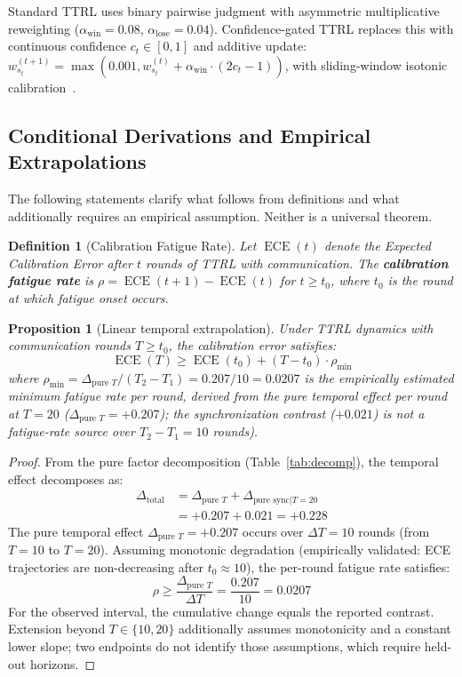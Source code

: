 \documentclass[11pt]{article}
\DeclareMathOperator{\ECE}{ECE}
\newtheorem{definition}{Definition}
\newtheorem{proposition}[theorem]{Proposition}
\begin{document}
Standard TTRL uses binary pairwise judgment with asymmetric multiplicative reweighting ($\alpha_{\text{win}} = 0.08$, $\alpha_{\text{lose}} = 0.04$). Confidence-gated TTRL replaces this with continuous confidence $c_t \in [0,1]$ and additive update: $w_{s_t}^{(t+1)} = \max(0.001, w_{s_t}^{(t)} + \alpha_{\text{win}} \cdot (2c_t - 1))$, with sliding-window isotonic calibration~\citep{niculescu2005predicting}.

\subsection{Conditional Derivations and Empirical Extrapolations}

The following statements clarify what follows from definitions and what additionally requires an empirical assumption. Neither is a universal theorem.

\begin{definition}[Calibration Fatigue Rate]
Let $\ECE(t)$ denote the Expected Calibration Error after $t$ rounds of TTRL with communication. The \textbf{calibration fatigue rate} is $\rho = \ECE(t+1) - \ECE(t)$ for $t \geq t_0$, where $t_0$ is the round at which fatigue onset occurs.
\end{definition}

\begin{proposition}[Linear temporal extrapolation]\label{thm:fatigue}
Under TTRL dynamics with communication rounds $T \geq t_0$, the calibration error satisfies:
\begin{equation}
    \ECE(T) \geq \ECE(t_0) + (T - t_0) \cdot \rho_{\min}
\end{equation}
where $\rho_{\min} = \Delta_{\text{pure }T}/(T_2 - T_1) = 0.207/10 = 0.0207$ is the empirically estimated minimum fatigue rate per round, derived from the pure temporal effect per round at $T{=}20$ ($\Delta_{\text{pure }T} = +0.207$); the synchronization contrast ($+0.021$) is not a fatigue-rate source over $T_2 - T_1 = 10$ rounds).
\end{proposition}

\begin{proof}
From the pure factor decomposition (Table~\ref{tab:decomp}), the temporal effect decomposes as:
\begin{align}
    \Delta_{\text{total}} &= \Delta_{\text{pure } T} + \Delta_{\text{pure sync}|T=20} \\
    &= +0.207 + 0.021 = +0.228
\end{align}
The pure temporal effect $\Delta_{\text{pure } T} = +0.207$ occurs over $\Delta T = 10$ rounds (from $T{=}10$ to $T{=}20$). Assuming monotonic degradation (empirically validated: ECE trajectories are non-decreasing after $t_0 \approx 10$), the per-round fatigue rate satisfies:
\begin{equation}
    \rho \geq \frac{\Delta_{\text{pure } T}}{\Delta T} = \frac{0.207}{10} = 0.0207
\end{equation}
For the observed interval, the cumulative change equals the reported contrast. Extension beyond $T\in\{10,20\}$ additionally assumes monotonicity and a constant lower slope; two endpoints do not identify those assumptions, which require held-out horizons.
\end{proof}
\end{document}
